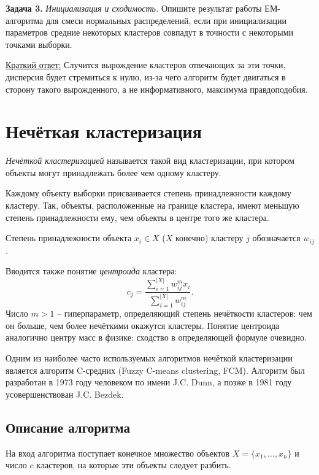 \noindent\textbf{Задача 3.} \emph{Инициализация и сходимость.}  
Опишите результат работы ЕМ-алгоритма для смеси нормальных распределений, если при инициализации параметров средние некоторых кластеров совпадут в точности с некоторыми точками выборки.

\underline{Краткий ответ:} Случится вырождение кластеров отвечающих за эти точки, дисперсия будет стремиться к нулю, из-за чего алгоритм будет двигаться в сторону такого вырожденного, а не информативного, максимума правдоподобия.


\section{Нечёткая кластеризация}

\textit{Нечёткой кластеризацией} называется такой вид кластеризации, при котором объекты могут
принадлежать более чем одному кластеру.

Каждому объекту выборки присваивается степень принадлежности каждому кластеру. Так, объекты,
расположенные на границе кластера, имеют меньшую степень принадлежности ему, чем объекты в центре
того же кластера.

Степень принадлежности объекта $x_i \in X$ ($X$ конечно) кластеру $j$ обозначается $w_{ij}$.

Вводится также понятие \textit{центроида} кластера:
\begin{equation}\label{fuzzy-clustering-centroid}
    c_j = \frac{\sum\limits_{i = 1}^{|X|} w_{ij}^{m} x_i}{\sum\limits_{i = 1}^{|X|} w_{ij}^{m}}.
\end{equation}
Число $m > 1$ -- гиперпараметр, определяющий степень нечёткости кластеров: чем он больше, чем более
нечёткими окажутся кластеры. Понятие центроида аналогично центру масс в физике: сходство в
определяющей формуле очевидно.

Одним из наиболее часто используемых алгоритмов нечёткой кластеризации является алгоритм
C-средних (Fuzzy C-means clustering, FCM). Алгоритм был разработан в 1973 году человеком по имени
J.C. Dunn, а позже в 1981 году усовершенствован J.C. Bezdek.

\subsection{Описание алгоритма}

На вход алгоритма поступает конечное множество объектов $X = \{x_1, \ldots, x_n\}$ и число $c$
кластеров, на которые эти объекты следует разбить.

